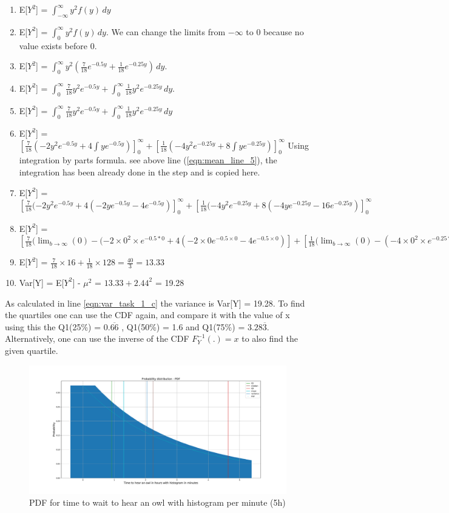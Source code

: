 \begin{enumerate}
    \item E[$Y^2$] = $\int_{-\infty}^{\infty}y^2f(y)\,dy$
    \item E[$Y^2$] = $\int_{0}^{\infty} y^2f(y)\,dy$.  We can change the limits from $-\infty$ to 0 because no value exists before 0.
    \item E[$Y^2$] = $\int_{0}^{\infty} y^2(\frac{7}{18}e^{-0.5y} + \frac{1}{18}e^{-0.25y})\,dy$.
    \item E[$Y^2$] = $\int_{0}^{\infty} \frac{7}{18}y^2e^{-0.5y} + \int_{0}^{\infty} \frac{1}{18}y^2e^{-0.25y}\,dy$.
    \item E[$Y^2$] = $\int_{0}^{\infty} \frac{7}{18}y^2e^{-0.5y} + \int_{0}^{\infty} \frac{1}{18}y^2e^{-0.25y}\,dy$
    \item E[$Y^2$] = $[\frac{7}{18}(-2y^2e^{-0.5y}+4\int ye^{-0.5y})]_0^\infty + [\frac{1}{18}(-4y^2e^{-0.25y}+8\int ye^{-0.25y})]_0^\infty$ Using integration by parts formula. see above line (\ref{eqn:mean_line_5}), the integration has been already done in the step and is copied here.
    \item E[$Y^2$] = $[\frac{7}{18}(-2y^2e^{-0.5y} +4(-2ye^{-0.5y}-4e^{-0.5y})]_0^\infty + [\frac{1}{18}(-4y^2e^{-0.25y} +8(-4ye^{-0.25y}-16e^{-0.25y})]_0^\infty$
    \item E[$Y^2$] = $[\frac{7}{18}(\lim_{b\to\infty}(0)-(-2\times 0^2 \times e^{-0.5*0} +4(-2\times0e^{-0.5\times0}-4e^{-0.5\times0})] + [\frac{1}{18}(\lim_{b\to\infty}(0)-(-4\times0^2 \times e^{-0.25*0} )+8(-4\times0 \times e^{-0.25\times 0}-16e^{-0.25*0})]$
    \item E[$Y^2$] = $\frac{7}{18}\times 16 + \frac{1}{18}\times 128 = \frac{40}{3}= 13.33$
    \item Var[Y] = E[$Y^2$] - $\mu^2$ = $13.33 + 2.44^2$ = 19.28 \label{eqn:var_task_1_c}
\end{enumerate}
As calculated in line \ref{eqn:var_task_1_c} the variance is Var[Y] = 19.28. To find the quartiles one can use the CDF again, and compare it with the value of x using this the Q1(25\%) = $0.\overline{66}$ , Q1(50\%) = 1.6 and Q1(75\%) = $3.28\overline{3}$. Alternatively, one can use the inverse of the CDF $F_{Y}^{-1} (.)=x$ to also find the given quartile.

\begin{figure}[h!]
\centering
\includegraphics[width=\textwidth]{pics/task_1_c_pdf.pdf}
\caption{PDF for time to wait to hear an owl with histogram per minute (5h)}\label{fig:task_1_c}
\end{figure}
\FloatBarrier    

